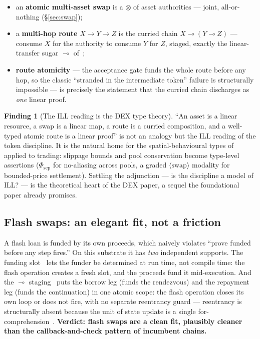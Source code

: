 \documentclass[11pt]{article}
\theoremstyle{definition}
\newtheorem{finding}{Finding}
\newcommand{\Fsep}{\ensuremath{\Phi_{\mathrm{sep}}}}
\newcommand{\lolli}{\ensuremath{\multimap}}
\begin{document}
\begin{itemize}[leftmargin=1.4em]
\item an \textbf{atomic multi-asset swap} is a $\otimes$ of asset authorities --- joint, all-or-nothing
(\S\ref{sec:swap});
\item a \textbf{multi-hop route} $X \to Y \to Z$ is the curried chain $X \lolli (Y \lolli Z)$ ---
consume $X$ for the authority to consume $Y$ for $Z$, staged, exactly the linear-transfer sugar
$\lolli$ of~\cite[\S4.9]{cost};
\item \textbf{route atomicity} --- the acceptance gate funds the whole route before any hop, so the
classic ``stranded in the intermediate token'' failure is structurally impossible --- is precisely the
statement that the curried chain discharges as \emph{one} linear proof.
\end{itemize}

\begin{finding}[The ILL reading is the DEX type theory]\label{find:ill}
``An asset is a linear resource, a swap is a linear map, a route is a curried composition, and a
well-typed atomic route is a linear proof'' is not an analogy but the ILL reading of the token
discipline. It is the natural home for the spatial-behavioural types of~\cite[\S8]{finrho} applied to
trading: slippage bounds and pool conservation become type-level assertions ($\Fsep$ for no-aliasing
across pools, a graded $\langle \text{swap} \rangle$ modality for bounded-price settlement). Settling
the adjunction --- is the discipline a model of ILL? --- is the theoretical heart of the DEX paper, a
sequel the foundational paper already promises.
\end{finding}

\subsection{Flash swaps: an elegant fit, not a friction}\label{sec:flash}

A flash loan is funded by its own proceeds, which naively violates ``prove funded before any step
fires.'' On this substrate it has \emph{two} independent supports. The funding
slot~\cite[\S5.7]{cost} lets the funder be determined at run time, not compile time: the flash
operation creates a fresh slot, and the proceeds fund it mid-execution. And the $\lolli$
staging~\cite[\S4.9]{cost} puts the borrow leg (funds the rendezvous) and the repayment leg (funds the
continuation) in one atomic scope: the flash operation closes its own loop or does not fire, with no
separate reentrancy guard --- reentrancy is structurally absent because the unit of state update is a
single for-comprehension~\cite[Rmk.\,8.2]{cost}. \textbf{Verdict: flash swaps are a clean fit,
plausibly cleaner than the callback-and-check pattern of incumbent chains.}
\end{document}

